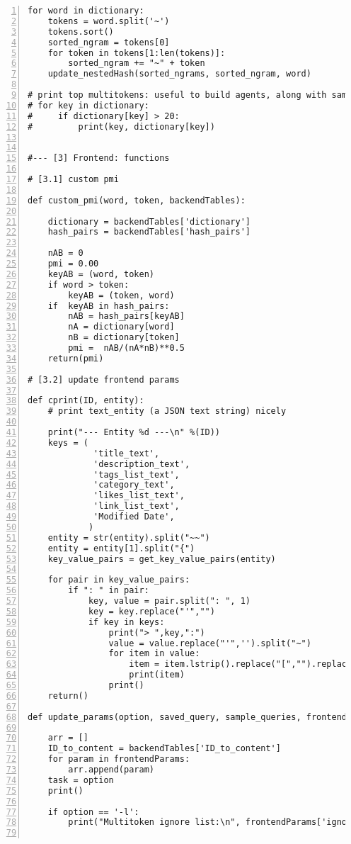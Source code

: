 \documentclass[10pt]{article}
\begin{document}
{\begin{lstlisting}[numbers=left,basicstyle=\ttfamily\footnotesize]
for word in dictionary:
    tokens = word.split('~')
    tokens.sort()
    sorted_ngram = tokens[0]
    for token in tokens[1:len(tokens)]:
        sorted_ngram += "~" + token
    update_nestedHash(sorted_ngrams, sorted_ngram, word)

# print top multitokens: useful to build agents, along with sample prompts
# for key in dictionary:
#     if dictionary[key] > 20:
#         print(key, dictionary[key])


#--- [3] Frontend: functions

# [3.1] custom pmi

def custom_pmi(word, token, backendTables):

    dictionary = backendTables['dictionary']
    hash_pairs = backendTables['hash_pairs']

    nAB = 0
    pmi = 0.00
    keyAB = (word, token)
    if word > token:
        keyAB = (token, word)
    if  keyAB in hash_pairs:
        nAB = hash_pairs[keyAB]
        nA = dictionary[word]
        nB = dictionary[token]
        pmi =  nAB/(nA*nB)**0.5
    return(pmi)

# [3.2] update frontend params

def cprint(ID, entity): 
    # print text_entity (a JSON text string) nicely

    print("--- Entity %d ---\n" %(ID))
    keys = (
             'title_text', 
             'description_text', 
             'tags_list_text', 
             'category_text', 
             'likes_list_text',
             'link_list_text',
             'Modified Date',
            )
    entity = str(entity).split("~~")
    entity = entity[1].split("{")
    key_value_pairs = get_key_value_pairs(entity)

    for pair in key_value_pairs: 
        if ": " in pair:
            key, value = pair.split(": ", 1)
            key = key.replace("'","")
            if key in keys:
                print("> ",key,":")
                value = value.replace("'",'').split("~")
                for item in value:
                    item = item.lstrip().replace("[","").replace("]","")
                    print(item)
                print()
    return()

def update_params(option, saved_query, sample_queries, frontendParams, backendTables):

    arr = []
    ID_to_content = backendTables['ID_to_content']
    for param in frontendParams:
        arr.append(param)
    task = option
    print()

    if option == '-l':
        print("Multitoken ignore list:\n", frontendParams['ignoreList'])


\end{lstlisting}}
\end{document}
